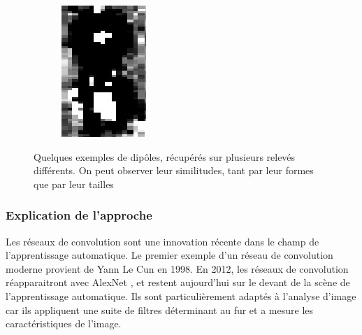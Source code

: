 \documentclass[a4paper, 12pt, titlepage, oneside, french]{article}
\begin{document}
\begin{figure}[H]
\begin{subfigure}[b]{0.3\linewidth}
		\end{subfigure}
		\begin{subfigure}[b]{0.3\linewidth}
			\includegraphics[width=\linewidth]{DipoleExemple3.png}
		\end{subfigure}

		\caption{Quelques exemples de dipôles, récupérés sur plusieurs relevés différents. On peut observer leur similitudes, tant par leur formes que par leur tailles}
		\label{fig:DipoleExample}
	\end{figure}

	\subsubsection{Explication de l'approche}
	Les réseaux de convolution sont une innovation récente dans le champ de l'apprentissage automatique. Le premier exemple d'un réseau de convolution moderne provient de Yann Le Cun \cite{lecun-01a} en 1998. En 2012, les réseaux de convolution réapparaitront avec AlexNet \cite{NIPS2012_4824}, et restent aujourd'hui sur le devant de la scène de l'apprentissage automatique. Ils sont particulièrement adaptés à l'analyse d'image car ils appliquent une suite de filtres déterminant au fur et a mesure les caractéristiques de l'image. 
	
\end{document}
